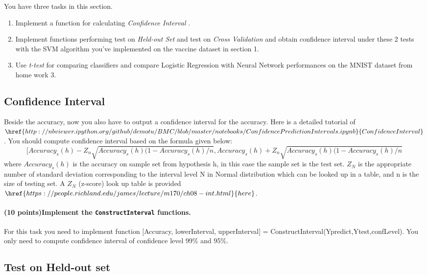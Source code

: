 \documentclass[11pt]{article}
\begin{document}
You have three tasks in this section.

\begin{enumerate}
\item Implement a function for calculating \textit{Confidence Interval} .
\item Implement functions performing test on \textit{Held-out Set} and test on \textit{Cross Validation} and obtain confidence interval under these 2 tests with the SVM algorithm you've implemented on the vaccine dataset in section 1.
\item Use \textit{t-test} for comparing classifiers and compare Logistic Regression with Neural Network performances on the MNIST dataset from home work 3.

\end{enumerate}

\subsection{Confidence Interval}

Beside the accuracy, now you also have to output a confidence interval for the accuracy. Here is a detailed tutorial of  $\href{http://nbviewer.ipython.org/github/demotu/BMC/blob/master/notebooks/ConfidencePredictionIntervals.ipynb}{Confidence Interval}$. You should compute confidence interval based on the formula given below:
$$[Accuracy_s(h)- Z_n \sqrt{Accuracy_s(h)(1-Accuracy_s(h)/n} , Accuracy_s(h)+Z_n\sqrt{Accuracy_s(h)(1-Accuracy_s(h)/n}$$
where $Accuracy_s(h)$ is the accuracy on sample set from hypothesis h, in this case the sample set is the test set. $Z_N$ is the appropriate number of standard deviation corresponding to the interval level N in Normal distribution which can be looked up in a table, and n is the size of testing set. A $Z_N$ (z-score) look up table is provided $\href{https://people.richland.edu/james/lecture/m170/ch08-int.html}{here}$.

\paragraph {(10 points)Implement the \texttt{ConstructInterval} functions.} For this task you need to implement function [Accuracy, lowerInterval, upperInterval] = ConstructInterval(Ypredict,Ytest,confLevel). You only need to compute confidence interval of confidence level 99\% and 95\%.

\subsection{Test on Held-out set }
\end{document}
